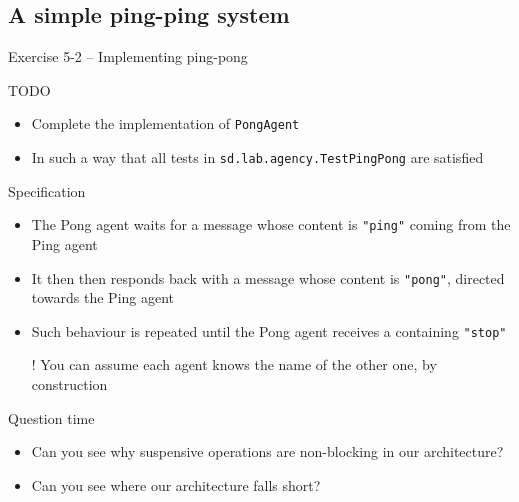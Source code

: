 \documentclass[presentation]{beamer}\mode<presentation>{\usetheme{AMSCesenaPurpleAndGold}}
\begin{document}
\subsection{A simple ping-ping system}

\begin{frame}[allowframebreaks]{Exercise 5-2 -- Implementing ping-pong}

\begin{block}{TODO}
    \begin{itemize}
        \item Complete the implementation of \texttt{\alert{PongAgent}}

        \item In such a way that all tests in \texttt{sd.lab.agency.\alert{TestPingPong}} are satisfied
    \end{itemize}
\end{block}

\begin{exampleblock}{Specification}
    \begin{itemize}
        \item The Pong agent waits for a message whose content is \texttt{"ping"} coming from the Ping agent

        \item It then then responds back with a message whose content is \texttt{"pong"}, directed towards the Ping agent

        \item Such behaviour is repeated until the Pong agent receives a containing \texttt{"stop"}

        \item[!] You can assume each agent knows the name of the other one, by construction
    \end{itemize}
\end{exampleblock}

\begin{alertblock}{Question time}
    \begin{itemize}
        \item Can you see why suspensive operations are non-blocking in our architecture?

        \item Can you see where our architecture falls short?
    \end{itemize}
\end{alertblock}

\end{frame}
\end{document}

